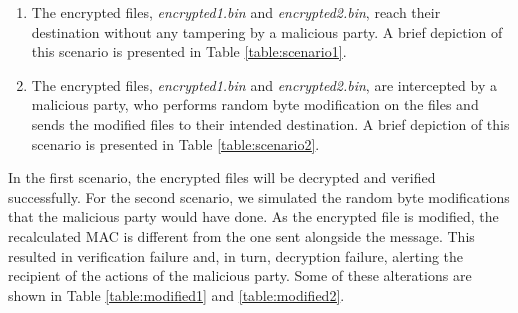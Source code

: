 \documentclass[a4paper]{cas-sc}
\begin{document}
\begin{enumerate}
    \item The encrypted files, \textit{encrypted1.bin} and \textit{encrypted2.bin}, reach their destination without any tampering by a malicious party. A brief depiction of this scenario is presented in Table \ref{table:scenario1}.
    \item The encrypted files, \textit{encrypted1.bin} and \textit{encrypted2.bin}, are intercepted by a malicious party, who performs random byte modification on the files and sends the modified files to their intended destination. A brief depiction of this scenario is presented in Table \ref{table:scenario2}.
\end{enumerate}
In the first scenario, the encrypted files will be decrypted and verified successfully. For the second scenario, we simulated the random byte modifications that the malicious party would have done. As the encrypted file is modified, the recalculated MAC is different from the one sent alongside the message. This resulted in verification failure and, in turn, decryption failure, alerting the recipient of the actions of the malicious party. Some of these alterations are shown in Table \ref{table:modified1} and \ref{table:modified2}.
\end{document}
